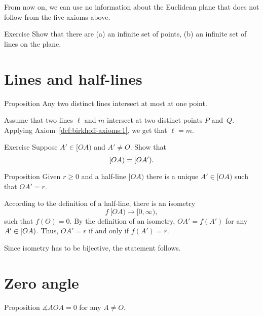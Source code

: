 From now on,  
we can use no information about the Euclidean plane that does not follow from the five axioms above.

\begin{thm}{Exercise}\label{ex:infinite}
Show that there are (a) an infinite set of points,
(b) an infinite set of lines on the plane.
\end{thm}

\section{Lines and half-lines}

\begin{thm}[\abs]{Proposition}\label{lem:line-line}
\let\thefootnote\relax{}
Any two distinct lines intersect at most at one point.
\end{thm}

Assume that two lines $\ell$ and $m$ intersect at two distinct points $P$ and~$Q$.
Applying Axiom~\ref{def:birkhoff-axioms:1}, we get that $\ell=m$.
\qeds

\begin{thm}{Exercise}\label{ex:[OA)=[OA')}
Suppose $A'\in[OA)$ and $A'\not=O$. 
Show that 
\[[O A)\z=[O A').\]

\end{thm}

\begin{thm}[\abs]{Proposition}\label{prop:point-on-half-line}
Given $r\ge 0$ and a half-line $[O A)$ there is a unique $A'\in [O A)$  such that $O A'=r$.
\end{thm}

According to the definition of a half-line, 
there is an isometry 
$$f\:[O A)\to [0,\infty),$$
such that $f(O)=0$.
By the definition of an isometry, $O A'=f(A')$ for any $A'\z\in [O A)$.
Thus, $O A'=r$ if and only if $f(A')=r$.

Since isometry has to be bijective, the statement follows.
\qeds

\section{Zero angle}

\begin{thm}[\abs]{Proposition}\label{lem:AOA=0}
$\measuredangle A O A= 0$ for any $A\not=O$.
\end{thm}

